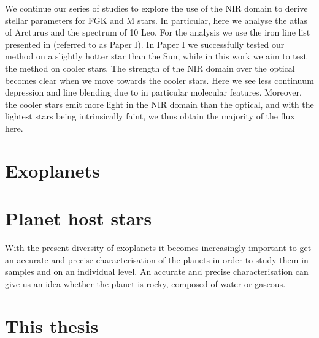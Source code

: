 We continue our series of studies to explore the use of the NIR domain to derive stellar parameters
for FGK and M stars. In particular, here we analyse the atlas of Arcturus and the spectrum of 10
Leo. For the analysis we use the iron line list presented in \citet{Andreasen2016} (referred to as
Paper I). In Paper I we successfully tested our method on a slightly hotter star than the Sun, while
in this work we aim to test the method on cooler stars. The strength of the NIR domain over the
optical becomes clear when we move towards the cooler stars. Here we see less continuum depression
and line blending due to in particular molecular features. Moreover, the cooler stars emit more
light in the NIR domain than the optical, and with the lightest stars being intrinsically faint, we
thus obtain the majority of the flux here.


\section{Exoplanets}
\label{sec:exoplanets}



\section{Planet host stars}
\label{sec:Planet_host_stars}

With the present diversity of exoplanets it becomes increasingly important to get an accurate and
precise characterisation of the planets in order to study them in samples and on an individual
level. An accurate and precise characterisation can give us an idea whether the planet is rocky,
composed of water or gaseous.








\section{This thesis}
\label{sec:this_thesis}
